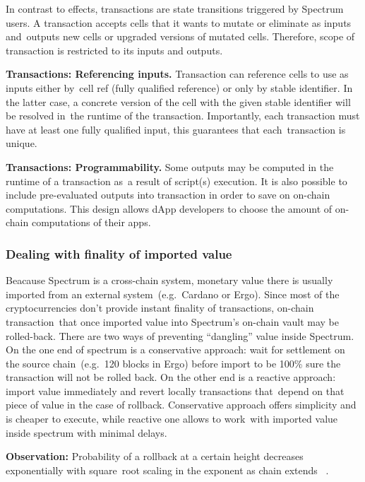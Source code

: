 In contrast to effects, transactions are state transitions triggered by Spectrum users.
A transaction accepts cells that it wants to mutate or eliminate as inputs and\
outputs new cells or upgraded versions of mutated cells.
Therefore, scope of transaction is restricted to its inputs and outputs.

\textbf{Transactions: Referencing inputs.} Transaction can reference cells to use as inputs either by\
cell ref (fully qualified reference) or only by stable identifier.
In the latter case, a concrete version of the cell with the given stable identifier will be resolved in\
the runtime of the transaction.
Importantly, each transaction must have at least one fully qualified input, this guarantees that each\
transaction is unique.

\textbf{Transactions: Programmability.} Some outputs may be computed in the runtime of a transaction as\
a result of script(s) execution.
It is also possible to include pre-evaluated outputs into transaction in order to save on on-chain computations.
This design allows dApp developers to choose the amount of on-chain computations of their apps.

\subsubsection{Dealing with finality of imported value}\label{subsubsec:dealing-with-finality-of-imported-value}

Beacause Spectrum is a cross-chain system, monetary value there is usually imported from an external system\
(e.g.\ Cardano or Ergo).
Since most of the cryptocurrencies don't provide instant finality of transactions, on-chain transaction\
that once imported value into Spectrum's on-chain vault may be rolled-back.
There are two ways of preventing \enquote{dangling} value inside Spectrum.
On the one end of spectrum is a conservative approach: wait for settlement on the source chain\
(e.g.\ 120 blocks in Ergo) before import to be 100\% sure the transaction will not be rolled back.
On the other end is a reactive approach: import value immediately and revert locally transactions that\
depend on that piece of value in the case of rollback.
Conservative approach offers simplicity and is cheaper to execute, while reactive one allows to work\
with imported value inside spectrum with minimal delays.

\textbf{Observation:} Probability of a rollback at a certain height decreases exponentially with square\
root scaling in the exponent as chain extends ~\cite{cryptoeprint:2017/573}.

